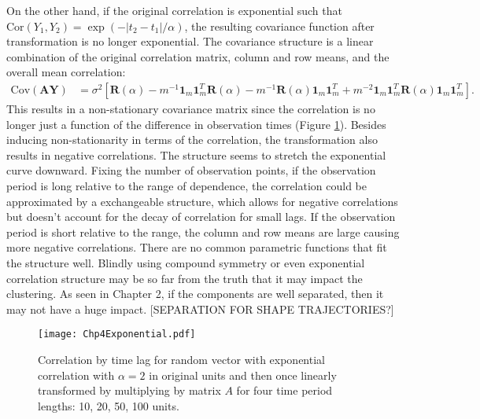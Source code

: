 \documentclass[12pt]{article}
\newcommand{\B}[0]{\mathbf}
\newcommand{\Cov}[0]{\text{Cov}}
\newcommand{\Cor}[0]{\text{Cor}}
\begin{document}
 On the other hand, if the original correlation is exponential such that $\Cor(Y_{1},Y_{2}) = \exp(-|t_{2}-t_{1}|/\alpha)$, the resulting covariance function after transformation is no longer exponential. The covariance structure is a linear combination of the original correlation matrix, column and row means, and the overall mean correlation:
   \begin{align*}
 \Cov(\B A\B Y) &= \sigma^{2}\left[\B R(\alpha)-m^{-1}\B1_{m}\B1_{m}^{T}\B R(\alpha)-m^{-1}\B R(\alpha)\B1_{m}\B1_{m}^{T} + m^{-2}\B1_{m}\B1_{m}^{T}\B R(\alpha)\B1_{m}\B1_{m}^{T}\right].
 \end{align*} 
 This results in a non-stationary covariance matrix since the correlation is no longer just a function of the difference in observation times (Figure \ref{fig:exp}). Besides inducing non-stationarity in terms of the correlation, the transformation also results in negative correlations. The structure seems to stretch the exponential curve downward. Fixing the number of observation points, if the observation period is long relative to the range of dependence, the correlation could be approximated by a exchangeable structure, which allows for negative correlations but doesn't account for the decay of correlation for small lags. If the observation period is short relative to the range, the column and row means are large causing more negative correlations. There are no common parametric functions that  fit the structure well. Blindly using compound symmetry or even exponential correlation structure may be so far from the truth that it may impact the clustering. As seen in Chapter 2, if the components are well separated, then it may not have a huge impact. [SEPARATION FOR SHAPE TRAJECTORIES?]
\begin{figure}
\begin{center}
\texttt{[image: Chp4Exponential.pdf]}
\end{center}
\label{fig:exp}
\caption{Correlation by time lag for random vector with exponential correlation with $\alpha = 2$ in original units and then once linearly transformed by multiplying by matrix $A$ for four time period lengths: 10, 20, 50, 100 units.}
\end{figure}
\end{document}
